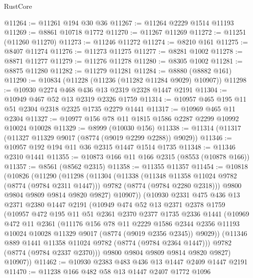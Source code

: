\begin{lexlean}{RustCore}
\begin{coremodule}
@11264 := @11261 @194 @30 @36
@11267 := @11264 @2229 @1514 @11193
@11269 := @8861 @10718 @1772
@11270 := @11267 @11269
@11272 := @11251 (@11260 @11270)
@11273 := @11246 @11272
@11274 := @8210 @161
@11275 := @8407 @11274
@11276 := @11273 @11275
@11277 := @8281 @1002
@11278 := @8871 @11277
@11279 := @11276 @11278
@11280 := @8305 @1002
@11281 := @8875 @11280
@11282 := @11279 @11281
@11284 := @8880 (@8882 @161)
@11290 := @10834 (@11228 (@11236 (@11282 @11284 @9029) @10907))
@11298 := @10930 @2274 @468 @436 @13 @2319 @2328 @1447 @2191
@11304 := @10949 @467 @52 @13 @2319 @2326 @1759
@11314 := @10957 @465 @195 @11 @51 @2304 @2318 @2325 @1735 @2279 @1441
@11317 := @10969 @465 @11 @2304
@11327 := @10977 @156 @78 @11 @1815 @1586 @2287 @2299 @10992 @10024 @10028
@11329 := @8999 (@10030 @156)
@11338 := @11314 (@11317 (@11327 @11329 @9017 (@8774 (@9019 @2299 @2288)) @9029))
@11346 := @10957 @192 @194 @11 @36 @2315 @1447 @1514 @1735
@11348 := @11346 @2310 @1441
@11355 := @10873 @166 @11 @166 @2315 (@8553 (@10878 @166))
@11357 := @8561 (@8562 @2315)
@11358 := @11355 @11357
@11454 := @10818
    (@10826
      (@11290
        (@11298
          (@11304
            (@11338
              (@11348 @11358 @11024 @9782 (@8774 (@9784 @2311 @1447)))
              @9782
              (@8774 (@9784 @2280 @2318)))
            @9800
            @9804
            @9809
            @9814
            @9820
            @9827)
          @10907))
      (@10930
        @2331
        @475
        @436
        @13
        @2371
        @2380
        @1447
        @2191
        (@10949
          @474
          @52
          @13
          @2371
          @2378
          @1759
          (@10957
            @472
            @195
            @11
            @51
            @2361
            @2370
            @2377
            @1735
            @2336
            @1441
            (@10969
              @472
              @11
              @2361
              (@11176
                @156
                @78
                @11
                @2229
                @1586
                @2344
                @2356
                @11193
                @10024
                @10028
                @11329
                @9017
                (@8774 (@9019 @2356 @2345))
                @9029))
            (@11346 @889 @1441 @11358 @11024 @9782 (@8774 (@9784 @2364 @1447)))
            @9782
            (@8774 (@9784 @2337 @2370)))
          @9800
          @9804
          @9809
          @9814
          @9820
          @9827)
        @10907))
@11462 := @10930 @2383 @483 @436 @13 @1447 @2409 @1447 @2191
@11470 := @11238 @166 @482 @58 @13 @1447 @2407 @1772 @1096

\end{coremodule}
\end{lexlean}
